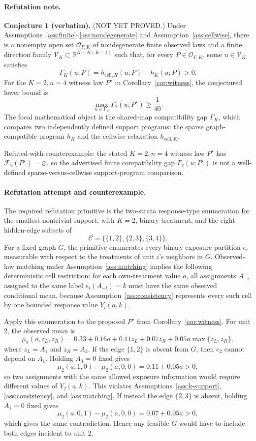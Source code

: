 \paragraph{Refutation note.}
\textbf{Conjecture 1 (verbatim).}
(NOT YET PROVED.)  Under Assumptions~\ref{ass:finite}--\ref{ass:nondegenerate} and Assumption~\ref{ass:cellwise}, there is a nonempty open set \(\mathcal O_{\Gamma,K}\) of nondegenerate finite observed laws and a finite direction family \(\mathcal V_K\subset\mathbb R^{K+K(K-1)}\) such that, for every \(P\in\mathcal O_{\Gamma,K}\), some \(u\in\mathcal V_K\) satisfies
\[
\Gamma_K(u;P)=h_{\mathrm{cell},K}(u;P)-h_K(u;P)>0.
\]
For the \(K=2,n=4\) witness law \(P^\star\) in Corollary~\ref{cor:witness}, the conjectured lower bound is
\[
\max_{u\in\mathcal V_2}\Gamma_2(u;P^\star)\ge \frac{1}{40}.
\]
The focal mathematical object is the shared-map compatibility gap \(\Gamma_K\), which compares two independently defined support programs: the sparse graph-compatible program \(h_K\) and the cellwise relaxation \(h_{\mathrm{cell},K}\).

\medskip
\noindent Refuted-with-counterexample: the stated \(K=2,n=4\) witness law \(P^\star\) has \(\mathcal F_2(P^\star)=\varnothing\), so the advertised finite compatibility gap \(\Gamma_2(u;P^\star)\) is not a well-defined sparse-versus-cellwise support-program comparison.

\paragraph{Refutation attempt and counterexample.}
The required refutation primitive is the two-strata response-type enumeration for the smallest nontrivial support, with \(K=2\), binary treatment, and the eight hidden-edge subsets of
\[
\mathcal C=\{\{1,2\},\{2,3\},\{3,4\}\}.
\]
For a fixed graph \(G\), the primitive enumerates every binary exposure partition \(e_i\) measurable with respect to the treatments of unit \(i\)'s neighbors in \(G\).  Observed-law matching under Assumption~\ref{ass:matching} implies the following deterministic cell restriction: for each own-treatment value \(a\), all assignments \(A_{-i}\) assigned to the same label \(e_i(A_{-i})=k\) must have the same observed conditional mean, because Assumption~\ref{ass:consistency} represents every such cell by one bounded response value \(Y_i(a,k)\).

Apply this enumeration to the proposed \(P^\star\) from Corollary~\ref{cor:witness}.  For unit \(2\), the observed mean is
\[
\mu_2(a,z_L,z_R)=0.33+0.16a+0.11z_L+0.07z_R+0.05a\max\{z_L,z_R\},
\]
where \(z_L=A_1\) and \(z_R=A_3\).  If the edge \(\{1,2\}\) is absent from \(G\), then \(e_2\) cannot depend on \(A_1\).  Holding \(A_3=0\) fixed gives
\[
\mu_2(a,1,0)-\mu_2(a,0,0)=0.11+0.05a>0,
\]
so two assignments with the same allowed exposure information would require different values of \(Y_2(a,k)\).  This violates Assumptions~\ref{ass:k-support}, \ref{ass:consistency}, and \ref{ass:matching}.  If instead the edge \(\{2,3\}\) is absent, holding \(A_1=0\) fixed gives
\[
\mu_2(a,0,1)-\mu_2(a,0,0)=0.07+0.05a>0,
\]
which gives the same contradiction.  Hence any feasible \(G\) would have to include both edges incident to unit \(2\).

